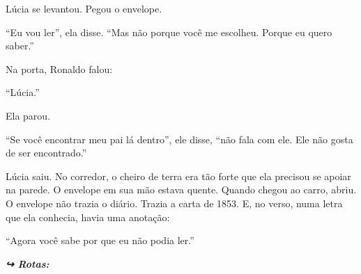 \noindent Lúcia se levantou. Pegou o envelope.

\noindent ``Eu vou ler'', ela disse. ``Mas não porque você me escolheu. Porque eu quero saber.''

\noindent Na porta, Ronaldo falou:

\noindent ``Lúcia.''

\noindent Ela parou.

\noindent ``Se você encontrar meu pai lá dentro'', ele disse, ``não fala com ele. Ele não gosta de ser encontrado.''

\noindent Lúcia saiu. No corredor, o cheiro de terra era tão forte que ela precisou se apoiar na parede. O envelope em sua mão estava quente. Quando chegou ao carro, abriu. O envelope não trazia o diário. Trazia a carta de 1853. E, no verso, numa letra que ela conhecia, havia uma anotação:

\noindent ``Agora você sabe por que eu não podia ler.''

\noindent\textit{\textbf{↪ Rotas:}  \rotasep {} \rotasep {}}
